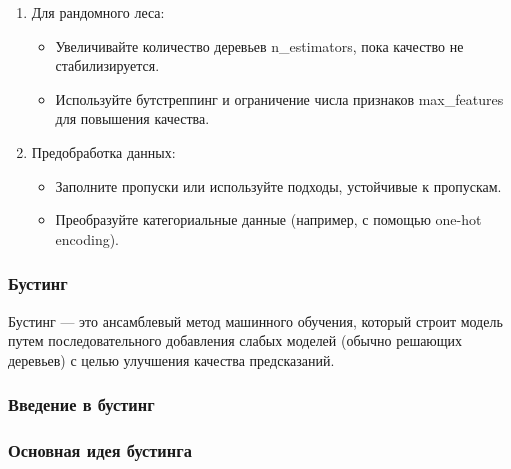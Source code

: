 \begin{enumerate}
\begin{enumerate}
  \begin{itemize}
  \tightlist
  \item
    Начинайте с небольших глубин и увеличивайте их при необходимости.
  \item
    Используйте кросс-валидацию для выбора оптимальных гиперпараметров.
  \end{itemize}
\item
  Для рандомного леса:

  \begin{itemize}
  \tightlist
  \item
    Увеличивайте количество деревьев n\_estimators, пока качество не
    стабилизируется.
  \item
    Используйте бутстреппинг и ограничение числа признаков
    max\_features для повышения качества.
  \end{itemize}
\item
  Предобработка данных:

  \begin{itemize}
  \tightlist
  \item
    Заполните пропуски или используйте подходы, устойчивые к пропускам.
  \item
    Преобразуйте категориальные данные (например, с помощью one-hot
    encoding).
  \end{itemize}
\end{enumerate}

\hypertarget{ux431ux443ux441ux442ux438ux43dux433}{%
\subsubsection*{Бустинг}\label{ux431ux443ux441ux442ux438ux43dux433}}

Бустинг --- это ансамблевый метод машинного обучения, который строит модель
путем последовательного добавления слабых моделей (обычно решающих
деревьев) с целью улучшения качества предсказаний.

\hypertarget{ux432ux432ux435ux434ux435ux43dux438ux435-ux432-ux431ux443ux441ux442ux438ux43dux433}{%
\subsubsection*{Введение в
бустинг}\label{ux432ux432ux435ux434ux435ux43dux438ux435-ux432-ux431ux443ux441ux442ux438ux43dux433}}

\hypertarget{ux43eux441ux43dux43eux432ux43dux430ux44f-ux438ux434ux435ux44f-ux431ux443ux441ux442ux438ux43dux433ux430}{%
\subsubsection*{Основная идея
бустинга}\label{ux43eux441ux43dux43eux432ux43dux430ux44f-ux438ux434ux435ux44f-ux431ux443ux441ux442ux438ux43dux433ux430}}


\end{enumerate}
